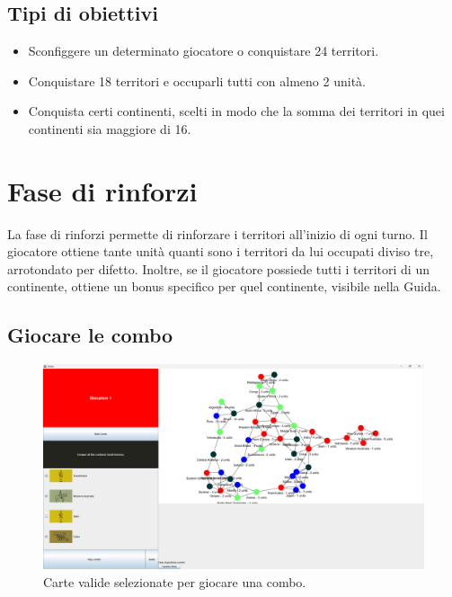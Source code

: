 \documentclass[a4paper,12pt]{report}
\begin{document}
\subsection{Tipi di obiettivi}
\begin{itemize}
	\item Sconfiggere un determinato giocatore o conquistare 24 territori.
	\item Conquistare 18 territori e occuparli tutti con almeno 2 unità.
	\item Conquista certi continenti, scelti in modo che la somma dei territori in quei continenti sia maggiore di 16.
\end{itemize}

\section{Fase di rinforzi}
La fase di rinforzi permette di rinforzare i territori all'inizio di ogni turno.
Il giocatore ottiene tante unità quanti sono i territori da lui occupati diviso tre, arrotondato per difetto.
Inoltre, se il giocatore possiede tutti i territori di un continente, ottiene un bonus specifico per quel continente, visibile nella Guida.
\subsection{Giocare le combo}
\begin{figure}[H]
	\centering
	\includegraphics[width=1\textwidth]{user_guide/7_playing_combo.png}
	\caption{Carte valide selezionate per giocare una combo.}
\end{figure}
\end{document}
